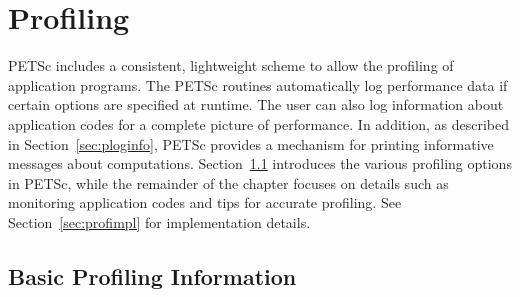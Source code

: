 {%
\chapter{Profiling} 
\label{ch:profiling} 

PETSc includes a consistent, lightweight scheme to allow the profiling
of application programs.  The PETSc routines automatically log
performance data if certain options are specified at runtime.  The
user can also log information about application codes for a complete
picture of performance.  In addition, as described in
Section~\ref{sec:ploginfo}, PETSc provides a mechanism for printing
informative messages about computations.  Section~\ref{sec:profbasic}
introduces the various profiling options in PETSc, while the
remainder of the chapter focuses on details such as monitoring
application codes and tips for accurate profiling.  See
Section~\ref{sec:profimpl} for implementation details.

\section{Basic Profiling Information}
\label{sec:profbasic}
   

}

